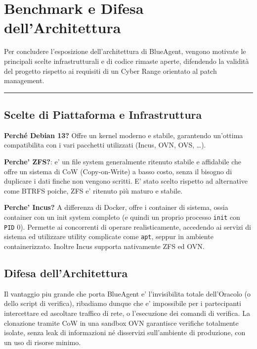 \section{Benchmark e Difesa
dell'Architettura}\label{benchmark-e-difesa-dellarchitettura}

Per concludere l'esposizione dell'architettura di BlueAgent, vengono
motivate le principali scelte infrastrutturali e di codice rimaste
aperte, difendendo la validità del progetto rispetto ai requisiti di un
Cyber Range orientato al patch management.

\begin{center}\rule{0.5\linewidth}{0.5pt}\end{center}

\subsection{Scelte di Piattaforma e
Infrastruttura}\label{scelte-di-piattaforma-e-infrastruttura}

\textbf{Perché Debian 13?} Offre un kernel moderno e stabile, garantendo
un'ottima compatibilita con i vari pacchetti utilizzati (Incus, OVN,
OVS, \ldots).

\textbf{Perche' ZFS?}: e' un file system generalmente ritenuto stabile e
affidabile che offre un sistema di CoW (Copy-on-Write) a basso costo,
senza il bisogno di duplicare i dati finche non vengono scritti. E'
stato scelto rispetto ad alternative come BTRFS poiche, ZFS e' ritenuto
più maturo e stabile.

\textbf{Perche' Incus?} A differenza di Docker, offre i container di
sistema, ossia container con un init system completo (e quindi un
proprio processo \passthrough{\lstinline!init!} con
\passthrough{\lstinline!PID!} 0). Permette ai concorrenti di operare
realisticamente, accedendo ai servizi di sistema ed utilizzare utility
complicate come \passthrough{\lstinline!apt!}, seppur in ambiente
containerizzato. Inoltre Incus supporta nativamente ZFS ed OVN.

\subsection{Difesa dell'Architettura}\label{difesa-dellarchitettura}

Il vantaggio piu grande che porta BlueAgent e' l'invisibilita totale
dell'Oracolo (o dello script di verifica), ribadiamo dunque che e'
impossibile per i partecipanti intercettare ed ascoltare traffico di
rete, o l'esecuzione dei comandi di verifica. La clonazione tramite CoW
in una sandbox OVN garantisce verifiche totalmente isolate, senza leak
di informazioni né disservizi sull'ambiente di produzione, con un uso di
risorse minimo.

